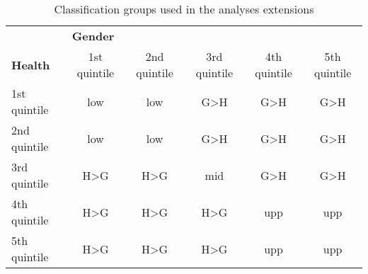 \begin{table}[!htb]
\centering
\caption{Classification groups used in the analyses extensions}
\label{table_class}
\begin{tabular}{lccccc}
\toprule
                & \multicolumn{5}{l}{\textbf{Gender}} \\
\textbf{Health} & 1st quintile & 2nd quintile & 3rd quintile & 4th quintile & 5th quintile \\
\midrule
1st quintile    & low & low & G>H & G>H & G>H \\
2nd quintile    & low & low & G>H & G>H & G>H \\
3rd quintile    & H>G & H>G & mid & G>H & G>H \\
4th quintile    & H>G & H>G & H>G & upp & upp \\
5th quintile    & H>G & H>G & H>G & upp & upp \\
\bottomrule
\end{tabular}
\end{table}
